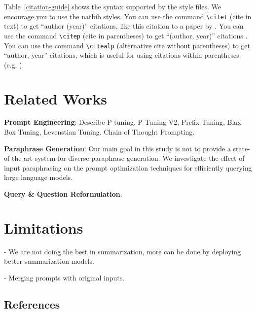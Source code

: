 \documentclass[11pt]{article}
\begin{document}
Table~\ref{citation-guide} shows the syntax supported by the style files.
We encourage you to use the natbib styles.
You can use the command \verb|\citet| (cite in text) to get ``author (year)'' citations, like this citation to a paper by \citet{Gusfield:97}.
You can use the command \verb|\citep| (cite in parentheses) to get ``(author, year)'' citations \citep{Gusfield:97}.
You can use the command \verb|\citealp| (alternative cite without parentheses) to get ``author, year'' citations, which is useful for using citations within parentheses (e.g. \citealp{Gusfield:97}).

\section{Related Works}

\noindent
{\bf Prompt Engineering}:
Describe P-tuning, P-Tuning V2, Prefix-Tuning, Blax-Box Tuning, Levenstian Tuning. Chain of Thought Prompting.

\noindent
{\bf Paraphrase Generation}:
Our main goal in this study is not to provide a state-of-the-art system for diverse paraphrase generation. We investigate the effect of input paraphrasing on the prompt optimization techniques for efficiently querying large language models.

\noindent
{\bf Query \& Question Reformulation}:


\section{Limitations}

- We are not doing the best in summarization, more can be done by deploying better summarization models.

- Merging prompts with original inputs.
\subsection{References}

\nocite{Ando2005,augenstein-etal-2016-stance,andrew2007scalable,rasooli-tetrault-2015,goodman-etal-2016-noise,harper-2014-learning}
\end{document}
